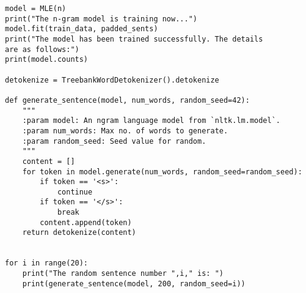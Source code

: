 \documentclass[12pt]{article}%
\begin{document}
\begin{lstlisting}
model = MLE(n)
print("The n-gram model is training now...")
model.fit(train_data, padded_sents)
print("The model has been trained successfully. The details
are as follows:")
print(model.counts)

detokenize = TreebankWordDetokenizer().detokenize

def generate_sentence(model, num_words, random_seed=42):
    """
    :param model: An ngram language model from `nltk.lm.model`.
    :param num_words: Max no. of words to generate.
    :param random_seed: Seed value for random.
    """
    content = []
    for token in model.generate(num_words, random_seed=random_seed):
        if token == '<s>':
            continue
        if token == '</s>':
            break
        content.append(token)
    return detokenize(content)


for i in range(20):
    print("The random sentence number ",i," is: ")
    print(generate_sentence(model, 200, random_seed=i))
\end{lstlisting}
\end{document}
